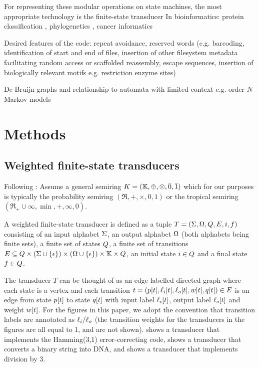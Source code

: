 \documentclass[english]{article}
\begin{document}
For representing these modular operations on state machines,
the most appropriate technology is the finite-state transducer \cite{MohriPereiraRiley2000,WikipediaTransducers}
In bioinformatics:
protein classification \cite{EskinEtAl2000},
phylogenetics \cite{PatenEtAl2008,WestessonEtAlArxiv2012,WestessonEtAl2012},
cancer informatics \cite{SchwarzEtAl2014}

Desired features of the code:
repeat avoidance,
reserved words (e.g. barcoding,
identification of start and end of files,
insertion of other filesystem metadata facilitating random access or scaffolded reassembly,
escape sequences,
insertion of biologically relevant motifs e.g. restriction enzyme sites)

De Bruijn graphs \cite{DeBruijn1946,PevznerEtAl2001,ZerbinoBirney2008,IqbalEtAl2012}
and relationship to automata with limited context e.g. order-$N$ Markov models


\section{Methods}

\subsection{Weighted finite-state transducers}

Following \cite{MohriPereiraRiley2000}:
Assume a general semiring
$K=(\mathbb{K},\oplus,\otimes,\bar{0},\bar{1})$
which for our purposes is typically the probability semiring
$(\Re,+,\times,0,1)$
or the tropical semiring
$(\Re_{+} \cup {\infty},\min,+,\infty,0)$.

A weighted finite-state transducer is defined as a tuple
$T = (\Sigma,\Omega,Q,E,i,f)$
consisting of an input alphabet $\Sigma$,
an output alphabet $\Omega$ (both alphabets being finite sets),
a finite set of states $Q$,
a finite set of transitions
$E \subseteq Q \times (\Sigma \cup \{ \epsilon \}) \times (\Omega \cup \{ \epsilon \}) \times \mathbb{K} \times Q$,
an initial state $i \in Q$
and a final state $f \in Q$.

The transducer $T$ can be thought of as an edge-labelled directed graph
where each state is a vertex
and each transition
$t = (p[t],\ell_i[t],\ell_o[t],w[t],q[t]) \in E$
is an edge from state $p[t]$ to state $q[t]$
with input label $\ell_i[t]$,
output label $\ell_o[t]$
and weight $w[t]$.
For the figures in this paper,
we adopt the convention that transition labels are annotated as $\ell_i{\tt /}\ell_o$
(the transition weights for the transducers in the figures are all equal to 1, and are not shown).
 shows a transducer that implements the Hamming(3,1) error-correcting code,
 shows a transducer that converts a binary string into DNA,
and
 shows a transducer that implements division by 3.
\end{document}
